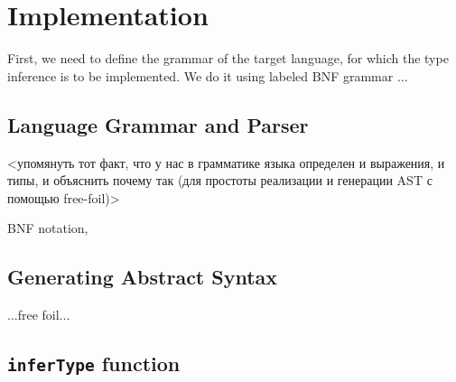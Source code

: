 \chapter{Implementation}
\label{chap:implementation}





First, we need to define the grammar of the target language, for which the type inference is to be implemented. We do it using labeled BNF grammar ...

\section{Language Grammar and Parser}

<упомянуть тот факт, что у нас в грамматике языка определен и выражения, и типы, и объяснить почему так (для простоты реализации и генерации AST с помощью free-foil)>

BNF notation, 


\section{Generating Abstract Syntax}

...free foil...


\section{\texttt{inferType} function}

